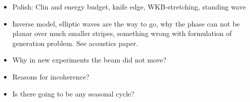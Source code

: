 \begin{itemize}
\item Polish: Clin and energy budget, knife edge, WKB-stretching, standing wave
\item Inverse model, elliptic waves are the way to go, why the phase can not be planar over much smaller stripes, something wrong with formulation of generation problem. See acoustics paper.
\item Why in new experiments the beam did not move?
\item Reasons for incoherence?
\item Is there going to be any seasonal cycle?
\end{itemize}




